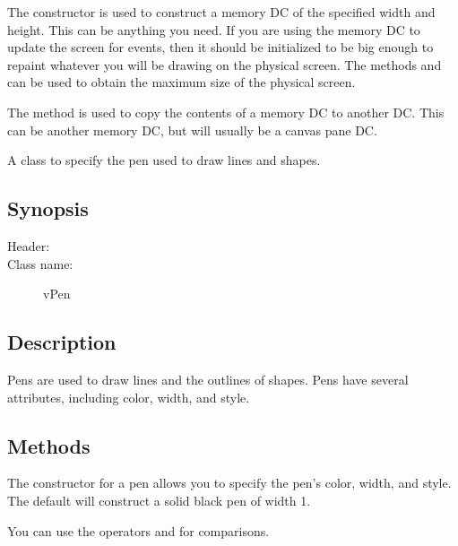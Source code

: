 The constructor is used to construct a memory DC of the
specified width and height. This can be anything you need.
If you are using the memory DC to update the screen for
 events, then it should be initialized to be
big enough to repaint whatever you will be drawing on the
physical screen. The methods   and
 can be used to obtain the maximum
size of the physical screen.

The method  is used to copy the contents
of a memory DC to another DC. This can be another memory DC, but
will usually be a canvas pane DC.


A class to specify the pen used to draw lines and shapes.

\subsection* {Synopsis}

\begin{description}
	\item [Header:] 
	\item [Class name:] vPen
\end{description}

\subsection* {Description}

Pens are used to draw lines and the outlines of shapes. Pens have
several attributes, including color, width, and style.

\subsection* {Methods}


The constructor for a pen allows you to specify the pen's color,
width, and style. The default will construct a solid black pen of
width 1.


You can use the operators \code{==} and \code{!=} for comparisons.


